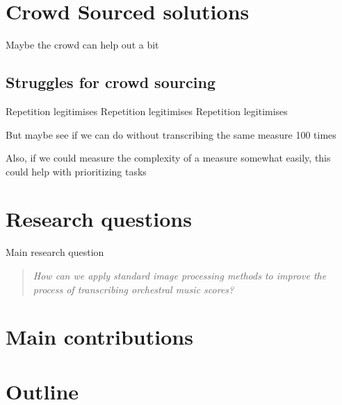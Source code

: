 \section{Crowd Sourced solutions}
Maybe the crowd can help out a bit

\subsection{Struggles for crowd sourcing}
Repetition legitimises
Repetition legitimises
Repetition legitimises

But maybe see if we can do without transcribing the same measure 100 times

Also, if we could measure the complexity of a measure somewhat easily, this could help with prioritizing tasks

\section{Research questions}
Main research question
\begin{quote}
    \textit{How can we apply standard image processing methods to improve the process of transcribing orchestral music scores?}
\end{quote}

\section{Main contributions}

\section{Outline}
